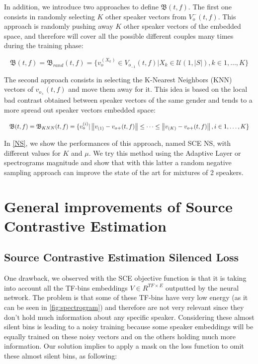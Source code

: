 \documentclass[master, tikz, final,11pt, dvipdfmx]{iscs-thesis}
\newcommand{\norm}[1]{\left\lVert#1\right\rVert}
\begin{document}
In addition, we introduce two approaches to define $\mathfrak{B}(t,f)$. The first one consists in randomly selecting $K$ other speaker vectors from $V_o^-(t,f)$. This approach is randomly pushing away $K$ other speaker vectors of the embedded space, and therefore will cover all the possible different couples many times during the training phase:

\[\mathfrak{B}(t,f) = \mathfrak{B}_{rand}(t,f) = \{v_o^{(X_k)} \in V_{o_{-1}}(t,f) | X_k \in \mathcal{U}(1,|S|), k \in 1, \dotsc,K\} \]

The second approach consists in selecting the K-Nearest Neighbors (KNN) vectors of $v_{o_{+}}(t,f)$ and move them away for it. This idea is based on the local bad contrast obtained between speaker vectors of the same gender and tends to a more spread out speaker vectors embedded space:

\begin{align*}
\resizebox{\textwidth}{!}{$\mathfrak{B}(t,f) = \mathfrak{B}_{KNN}(t,f) = \{v_o^{(i)} | \norm{v_{{(1)}}-v_o{_{+}}(t,f)} \leq \dots \leq \norm{v_{{(K)}}-v_o{_{+}}(t,f)}, i \in 1, \dotsc,K\}$}
\end{align*}

In \autoref{NS}, we show the performances of this approach, named SCE NS, with different values for $K$ and $\mu$. We try this method using the Adaptive Layer or spectrograms magnitude  and show that with this latter a random negative sampling approach can improve the state of the art for mixtures of 2 speakers.

\section{General improvements of Source Contrastive Estimation}

\subsection{Source Contrastive Estimation Silenced Loss}
\label{contrib:silence}

One drawback, we observed with the SCE objective function is that it is taking into account all the TF-bins embeddings $V \in R^{TF\times E}$ outputted by the neural network. The problem is that some of these TF-bins have very low energy (as it can be seen in \autoref{fig:spectrogram}) and therefore are not very relevant since they don't hold much information about any specific speaker. Considering these almost silent bins is leading to a noisy training because some speaker embeddings will be equally trained on these noisy vectors and on the others holding much more information. Our solution implies to apply a mask on the loss function to omit these almost silent bins, as following:
\end{document}
